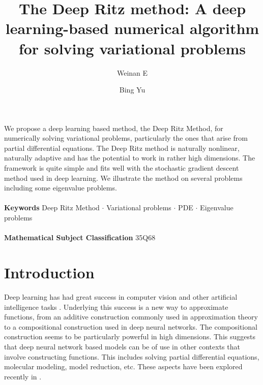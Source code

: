 \documentclass[a4paper,12pt]{article}
\begin{document}
\title{The Deep Ritz method: A deep learning-based 
numerical algorithm for solving variational problems}

\author[1]{ Weinan E}
\author[2]{Bing Yu}



\maketitle

 We propose a deep learning based method, the Deep Ritz Method, for numerically solving variational problems, particularly the ones that arise from partial differential equations. The Deep Ritz method is naturally nonlinear, naturally adaptive and has the potential to work in rather high dimensions. The framework is quite simple and fits well with the stochastic gradient descent method used in deep learning. We illustrate the method on several problems including some eigenvalue problems.
\\ \\
{\bf Keywords} Deep Ritz Method $\cdot$ Variational problems $\cdot$ PDE $\cdot$ Eigenvalue problems
\\ \\
{\bf Mathematical Subject Classification} 35Q68

\section{Introduction}

Deep learning has had great success in computer vision and other artificial
intelligence tasks \cite{book}. Underlying this success is a new way to
approximate functions, from an additive construction commonly used in
approximation theory to a compositional construction used in 
deep neural networks.
The compositional construction seems to be particularly powerful
in high dimensions. This suggests that deep neural network based models
can be of use in other contexts that involve constructing functions.
This includes solving partial differential
equations, molecular modeling, model reduction,  etc.
These aspects have been explored recently in \cite{E, Han-Jentzen-E,
E-Han-Jentzen, Beck-E-Jentzen, Han-Zhang-Car-E, Zhang-Han-Wang-Car-E}. 
\end{document}
